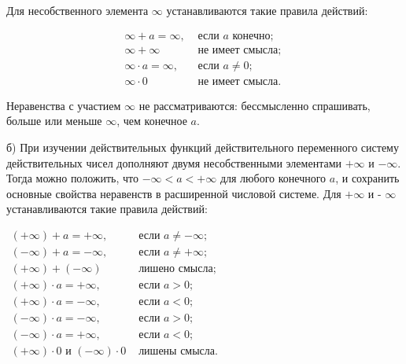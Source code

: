 \documentclass[10pt]{article}
\begin{document}
Для несобственного элемента $\infty$ устанавливаются такие правила действий:



\[

\begin{array}{ll}

\infty+a=\infty, & \text { если } a \text { конечно; } \\

\infty+\infty & \text { не имеет смысла; } \\

\infty \cdot a=\infty, & \text { если } a \neq 0 ; \\

\infty \cdot 0 & \text { не имеет смысла. }

\end{array}

\]



Неравенства с участием $\infty$ не рассматриваются: бессмысленно спрашивать, больше или меньше $\infty$, чем конечное $a$.



б) При изучении действительных функций действительного переменного систему действительных чисел дополняют двумя несобственными элементами $+\infty$ и $-\infty$. Тогда можно положить, что $-\infty<a<+\infty$ для любого конечного $a$, и сохранить основные свойства неравенств в расширенной числовой системе. Для $+\infty$ и - $\infty$ устанавливаются такие правила действий:



$\begin{array}{ll}(+\infty)+a=+\infty, & \text { если } a \neq-\infty ; \\ (-\infty)+a=-\infty, & \text { если } a \neq+\infty ; \\ (+\infty)+(-\infty) & \text { лишено смысла; } \\ (+\infty) \cdot a=+\infty, & \text { если } a>0 ; \\ (+\infty) \cdot a=-\infty, & \text { если } a<0 ; \\ (-\infty) \cdot a=-\infty, & \text { если } a>0 ; \\ (-\infty) \cdot a=+\infty, & \text { если } a<0 ; \\ (+\infty) \cdot 0 \text { и }(-\infty) \cdot 0 & \text { лишены смысла. }\end{array}$
\end{document}

